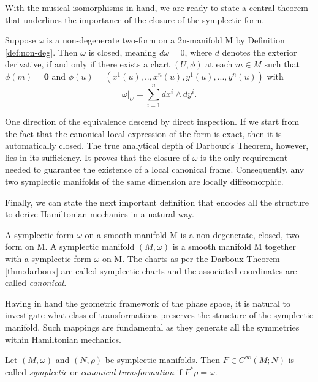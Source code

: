 \noindent With the musical isomorphisms in hand, we are ready to state a central theorem that underlines the importance of the closure of the symplectic form.

\begin{theorem}\label{thm:darboux}
	Suppose $\omega$ is a non-degenerate two-form on a 2n-manifold M by Definition \ref{def:non-deg}. Then $\omega$ is closed, meaning $d \omega = 0$, where $d$ denotes the exterior derivative, if and only if there exists a chart $(U, \phi)$ at each $m \in M$ such that $\phi(m) = \boldsymbol{0}$ and $\phi(u) = (x^1(u),..,x^n(u), y^1(u),...,y^n(u))$ with
	\[
		\omega|_U = \sum_{i=1}^n dx^i \wedge dy^i.
	\]
\end{theorem}

\begin{remark}\label{rem:darboux-consequences}
	One direction of the equivalence descend by direct inspection. If we start from the fact that the canonical local expression of the form is exact, then it is automatically closed. The true analytical depth of Darboux's Theorem, however, lies in its sufficiency. It proves that the closure of $\omega$ is the only requirement needed to guarantee the existence of a local canonical frame. Consequently, any two symplectic manifolds of the same dimension are locally diffeomorphic.
\end{remark}

\noindent Finally, we can state the next important definition that encodes all the structure to derive Hamiltonian mechanics in a natural way.

\begin{definition}\label{def:sympl-man}
	A symplectic form $\omega$ on a smooth manifold M is a non-degenerate, closed, two-form on M. A symplectic manifold $(M, \omega)$ is a smooth manifold M together with a symplectic form $\omega$ on M. The charts as per the Darboux Theorem \ref{thm:darboux} are called symplectic charts and the associated coordinates are called \emph{canonical}.
\end{definition}

Having in hand the geometric framework of the phase space, it is natural to investigate what class of transformations preserves the structure of the symplectic manifold. Such mappings are fundamental as they generate all the symmetries within Hamiltonian mechanics. 

\begin{definition}\label{def:canonical-transformation}
	Let $(M,\omega)$ and $(N,\rho)$ be symplectic manifolds. Then $F \in C^\infty(M;N)$ is called \emph{symplectic} or \emph{canonical transformation} if $F^*\rho = \omega$.
\end{definition}

